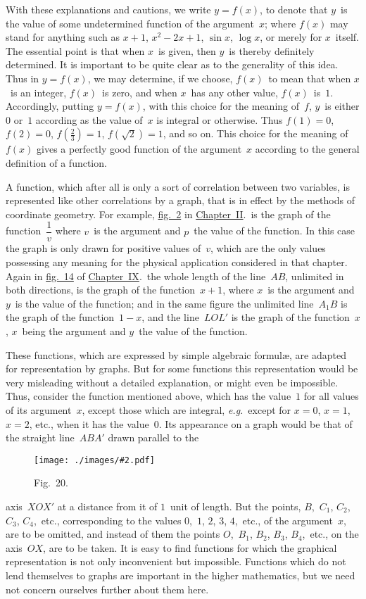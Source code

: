 \documentclass[12pt,leqno]{book}[2005/09/16]
\newcommand{\Chg}[2]{#2}
\newcommand{\Graphic}[2]{%
  \phantomsection\label{fig:#2}%
  \texttt{[image: ./images/\#2.pdf]}%
}
\newcommand{\DefWidth}{4in}%
\newcommand{\Figure}[2][\DefWidth]{%
  \begin{figure}[hbt!]
    \centering
    \phantomsection\label{fig:#2}
    \Graphic{#1}{fig#2}
    \caption{Fig.~#2.}
  \end{figure}\ignorespaces%
}
\newcommand{\Fig}[2][Fig.]{\hyperref[fig:#2]{#1~#2}}
\newcommand{\ChapRef}[2][Chapter]{\hyperref[chapter:#2]{\Chg{#1}{Chapter}~#2}}
\newcommand{\PageSep}[1]{\ignorespaces}
\newcommand{\eg}{\emph{e.g.}}
\begin{document}
With these explanations and cautions, we
write $y = f(x)$, to denote that $y$~is the value of
some undetermined function of the argument~$x$;
where $f(x)$ may stand for anything such
as $x + 1$, $x^{2} - 2x + 1$, $\sin x$, $\log x$, or merely for
$x$~itself. The essential point is that when $x$~is
given, then $y$~is thereby definitely determined.
It is important to be quite clear as
to the generality of this idea. Thus in $y = f(x)$,
we may determine, if we choose, $f(x)$~to
mean that when $x$~is an integer, $f(x)$~is zero,
and when $x$~has any other value, $f(x)$~is~$1$.
Accordingly, putting $y = f(x)$, with this choice
\PageSep{148}
for the meaning of~$f$, $y$~is either $0$ or~$1$ according
as the value of~$x$ is integral or otherwise.
Thus $f(1) = 0$, $f(2) = 0$, $f(\frac{2}{3}) = 1$, $f(\sqrt{2}) = 1$, and
so on. This choice for the meaning of~$f(x)$
gives a perfectly good function of the argument~$x$
according to the general definition of
a function.

A function, which after all is only a sort
%
of correlation between two variables, is represented
like other correlations by a graph,
that is in effect by the methods of coordinate
geometry. For example, \Fig[fig.]{2} in \ChapRef{II}.\
is the graph of the function~$\dfrac{1}{v}$ where $v$~is the
argument and $p$~the value of the function.
In this case the graph is only drawn for
positive values of~$v$, which are the only values
possessing any meaning for the physical application
considered in that chapter. Again
in \Fig[fig.]{14} of \ChapRef{IX}.\ the whole length of
the line~$AB$, unlimited in both directions, is
the graph of the function~$x + 1$, where $x$~is the
argument and $y$~is the value of the function;
and in the same figure the unlimited line~$A_{1}B$
is the graph of the function~$1 - x$, and
the line~$LOL'$ is the graph of the function~$x$,
$x$~being the argument and $y$~the value of the
function.

These functions, which are expressed by
simple algebraic formulæ, are adapted for representation
by graphs. But for some functions
\PageSep{149}
this representation would be very
misleading without a detailed explanation, or
might even be impossible. Thus, consider the
function mentioned above, which has the value~$1$
for all values of its argument~$x$, except
those which are integral, \eg\ except for $x = 0$,
$x = 1$, $x = 2$, etc., when it has the value~$0$.
Its appearance on a graph would be that of
the straight line~$ABA'$ drawn parallel to the
\Figure{20}
axis~$XOX'$ at a distance from it of $1$~unit of
length. But the points, $B$,~$C_{1}$, $C_{2}$, $C_{3}$, $C_{4}$,~etc.,
corresponding to the values $0$,~$1$, $2$, $3$, $4$,~etc., of
the argument~$x$, are to be omitted, and instead
of them the points $O$,~$B_{1}$, $B_{2}$, $B_{3}$, $B_{4}$,~etc.,
on the axis~$OX$, are to be taken. It is easy
to find functions for which the graphical representation
is not only inconvenient but
impossible. Functions which do not lend
themselves to graphs are important in the
\PageSep{150}
higher mathematics, but we need not concern
ourselves further about them here.
\end{document}
